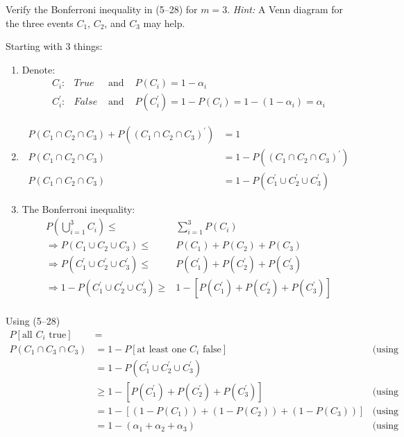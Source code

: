 Verify the Bonferroni inequality in (5--28) for $m = 3$.
\newline
\textit{Hint:} A Venn diagram for the three events $C_{1}$, $C_{2}$, and $C_{3}$ may help.
\newline
\par
Starting with 3 things:
\begin{enumerate}
    \item Denote:
    \begin{align*}
        C_{i}:          & True  & \text{ and } & P(C_{i}) = 1 - \alpha_{i}\\
        C_{i}^{\prime}: & False & \text{ and } & P(C_{i}^{\prime}) = 1 - P(C_{i}) = 1 - (1 - \alpha_{i}) = \alpha_{i}
    \end{align*}
    \item 
    \begin{align*}
        P(C_{1} \cap C_{2} \cap C_{3})
        +
        P({(C_{1} \cap C_{2} \cap C_{3})}^{\prime})
        &=
        1 \\
        P(C_{1} \cap C_{2} \cap C_{3})
        &=
        1
        -
        P({(C_{1} \cap C_{2} \cap C_{3})}^{\prime}) \\
        P(C_{1} \cap C_{2} \cap C_{3})
        &=
        1
        -
        P(C_{1}^{\prime} \cup C_{2}^{\prime} \cup C_{3}^{\prime})
    \end{align*}
    \item The Bonferroni inequality:
        \begin{align*}
            P(\bigcup_{i=1}^{3}{C_{i}}) \leq& \sum_{i=1}^{3}{P(C_{i})} \\
            \Rightarrow P(C_{1} \cup C_{2} \cup C_{3}) \leq& P(C_{1}) + P(C_{2}) + P(C_{3}) \\
            \Rightarrow P(C_{1}^{\prime} \cup C_{2}^{\prime} \cup C_{3}^{\prime}) \leq& P(C_{1}^{\prime}) + P(C_{2}^{\prime}) + P(C_{3}^{\prime}) \\
            \Rightarrow 1 - P(C_{1}^{\prime} \cup C_{2}^{\prime} \cup C_{3}^{\prime}) \geq& 1- \left[P(C_{1}^{\prime}) + P(C_{2}^{\prime}) + P(C_{3}^{\prime})\right] \\
        \end{align*}
\end{enumerate}

Using (5--28)
\begin{align*}
    P[\text{all }C_{i}\text{ true}] &= \\
    P(C_{1} \cap C_{3} \cap C_{3}) &= 1 - P[\text{at least one }C_{i}\text{ false}] & \text{(using 2.)} \\
    &= 1 - P(C_{1}^{\prime} \cup C_{2}^{\prime} \cup C_{3}^{\prime}) \\
    &\geq 1 - \left[P(C_{1}^{\prime}) + P(C_{2}^{\prime}) + P(C_{3}^{\prime})\right] & \text{(using 3.)} \\
    &= 1 - \left[(1 - P(C_{1})) + (1 - P(C_{2})) + (1 - P(C_{3}))\right] & \text{(using 1.)} \\
    &= 1 - \left(\alpha_{1} + \alpha_{2} + \alpha_{3}\right) & \text{(using 1.)}
\end{align*}

